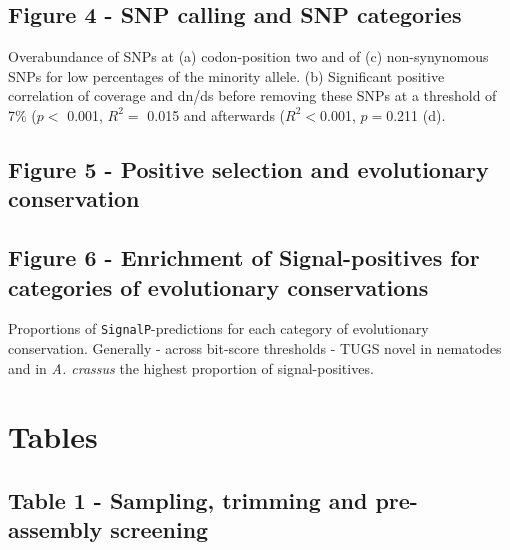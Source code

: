 \documentclass[10pt]{bmc_article}
\newenvironment{bmcformat}{\begin{raggedright}\baselineskip20pt\sloppy\setboolean{publ}{false}}{\end{raggedright}\baselineskip20pt\sloppy}
\begin{document}
\begin{bmcformat}
\subsection*{Figure 4 - SNP calling and SNP categories}
 
Overabundance of SNPs at (a) codon-position two and of (c)
non-synynomous SNPs for low percentages of the minority allele. (b)
Significant positive correlation of coverage and dn/ds before removing
these SNPs at a threshold of 7\% ($p<$ 0.001, $R^2=$
0.015 and afterwards
($R^2<$0.001,
$p=$0.211 (d).


\subsection*{Figure 5 - Positive selection and evolutionary
  conservation}




\subsection*{Figure 6 - Enrichment of Signal-positives for categories
  of evolutionary conservations}

Proportions of \texttt{SignalP}-predictions for each category of
evolutionary conservation. Generally - across bit-score thresholds -
TUGS novel in nematodes and in \textit{A. crassus} the highest
proportion of signal-positives.


\newpage

\section*{Tables}
  \subsection*{Table 1 - Sampling, trimming and pre-assembly screening}


\end{bmcformat}
\end{document}
